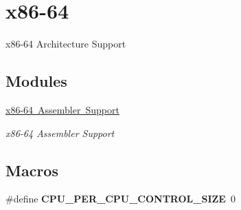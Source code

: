\hypertarget{group__RTEMSScoreCPUx86-64}{}\section{x86-\/64}
\label{group__RTEMSScoreCPUx86-64}


x86-\/64 Architecture Support  


\subsection*{Modules}
\begin{DoxyCompactItemize}
\item 
\mbox{\hyperlink{group__RTEMSScoreCPUx86-64ASM}{x86-\/64 Assembler Support}}
\begin{DoxyCompactList}\small\item\em x86-\/64 Assembler Support \end{DoxyCompactList}\end{DoxyCompactItemize}
\subsection*{Macros}
\begin{DoxyCompactItemize}
\item 
\mbox{\label{group__RTEMSScoreCPUx86-64_gaf8e38596ad3db49995fd8eb9fb4e86b2}} 
\#define {\bfseries C\+P\+U\+\_\+\+P\+E\+R\+\_\+\+C\+P\+U\+\_\+\+C\+O\+N\+T\+R\+O\+L\+\_\+\+S\+I\+ZE}~0
\end{DoxyCompactItemize}

